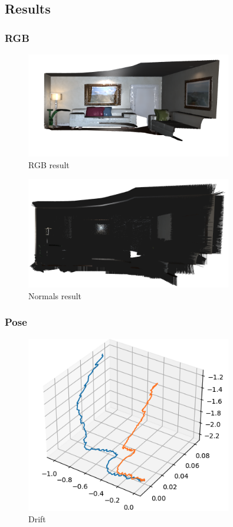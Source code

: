\documentclass[12pt, a4paper]{article}
\begin{document}
\subsection{Results}
\subsubsection{RGB}
\begin{figure}[H]
  \centering
  \includegraphics[width=0.8\textwidth]{./results/dense_slam/rgb.png}
  \caption{RGB result}
\end{figure}
\begin{figure}[H]
  \centering
  \includegraphics[width=0.8\textwidth]{./results/dense_slam/normals.png}
  \caption{Normals result}
\end{figure}
\subsubsection{Pose}
\begin{figure}[H]
  \centering
  \includegraphics[width=0.8\textwidth]{./results/dense_slam/pose.png}
  \caption{Drift}
\end{figure}
\end{document}
